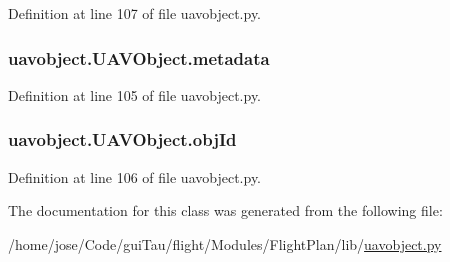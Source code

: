 Definition at line 107 of file uavobject.\-py.

\hypertarget{classuavobject_1_1_u_a_v_object_a00f0fd345df36ab7ff5e70d12ed90ce8}{
\subsubsection[{metadata}]{\setlength{\rightskip}{0pt plus 5cm}uavobject.\-U\-A\-V\-Object.\-metadata}}\label{classuavobject_1_1_u_a_v_object_a00f0fd345df36ab7ff5e70d12ed90ce8}


Definition at line 105 of file uavobject.\-py.

\hypertarget{classuavobject_1_1_u_a_v_object_aff7e18dd61e0464e32b141d3b123209c}{
\subsubsection[{obj\-Id}]{\setlength{\rightskip}{0pt plus 5cm}uavobject.\-U\-A\-V\-Object.\-obj\-Id}}\label{classuavobject_1_1_u_a_v_object_aff7e18dd61e0464e32b141d3b123209c}


Definition at line 106 of file uavobject.\-py.



The documentation for this class was generated from the following file\-:\begin{DoxyCompactItemize}
\item 
/home/jose/\-Code/gui\-Tau/flight/\-Modules/\-Flight\-Plan/lib/\hyperlink{uavobject_8py}{uavobject.\-py}\end{DoxyCompactItemize}
